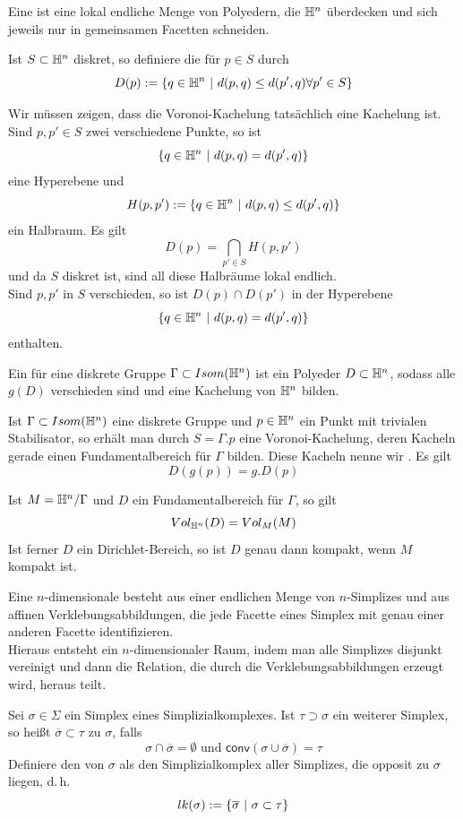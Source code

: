 \documentclass{book}
\begin{document}
\Def{}
Eine  ist eine lokal endliche Menge von Polyedern, die $\mathbb{H}^n$ überdecken und sich jeweils nur in gemeinsamen Facetten schneiden.

\Prop{}
Ist $S \subset \mathbb{H}^n$ diskret, so definiere die  für $p \in S$ durch
\[ D(p) := \set{q \in \H^n}{d(p,q) \leq d(p',q) \forall p' \in S } \]
\begin{Beweis}{}
	Wir müssen zeigen, dass die Voronoi-Kachelung tatsächlich eine Kachelung ist. Sind $p,p'\in S$ zwei verschiedene Punkte, so ist
	\[ \set{q \in \H^n}{d(p,q) = d(p',q)} \]
	eine Hyperebene und
	\[ H(p,p') := \set{q \in \H^n}{d(p,q) \leq d(p',q)} \]
	ein Halbraum. Es gilt
	\[ D(p) = \bigcap_{p'\in S} H(p,p')  \]
	und da $S$ diskret ist, sind all diese Halbräume lokal endlich.\\
	Sind $p,p'$ in $S$ verschieden, so ist $D(p) \cap D(p')$ in der Hyperebene
	\[\set{q \in \H^n}{d(p,q) = d(p',q)} \]
	enthalten.
\end{Beweis}

\Def{}
Ein  für eine diskrete Gruppe $\Gamma \subset Isom(\mathbb{H}^n)$ ist ein Polyeder $D \subset \mathbb{H}^n$, sodass alle $g(D)$ verschieden sind und eine Kachelung von $\mathbb{H}^n$ bilden.

\Bem{}
Ist $\Gamma \subset Isom(\mathbb{H}^n)$ eine diskrete Gruppe und $p\in \mathbb{H}^n$ ein Punkt mit trivialen Stabilisator, so erhält man durch $S = \Gamma.p$ eine Voronoi-Kachelung, deren Kacheln gerade einen Fundamentalbereich für $\Gamma$ bilden. Diese Kacheln nenne wir . Es gilt
\[ D(g(p)) = g.D(p) \]

\Prop{}
Ist $M = \mathbb{H}^n / \Gamma$ und $D$ ein Fundamentalbereich für $\Gamma$, so gilt
\[ Vol_{\mathbb{H}^n}(D) = Vol_M(M) \]
Ist ferner $D$ ein Dirichlet-Bereich, so ist $D$ genau dann kompakt, wenn $M$ kompakt ist.

\Def{}
Eine $n$-dimensionale  besteht aus einer endlichen Menge von $n$-Simplizes und aus affinen Verklebungsabbildungen, die jede Facette eines Simplex mit genau einer anderen Facette identifizieren.\\
Hieraus entsteht ein $n$-dimensionaler Raum, indem man alle Simplizes disjunkt vereinigt und dann die Relation, die durch die Verklebungsabbildungen erzeugt wird, heraus teilt.

\Def{}
Sei $\sigma \in \Sigma$ ein Simplex eines Simplizialkomplexes. Ist $\tau \supset \sigma$ ein weiterer Simplex, so heißt $\overline{\sigma} \subset \tau$  zu $\sigma$, falls
\[ \sigma \cap \overline{\sigma} = \emptyset \text{ und } \textsf{conv}(\sigma \cup \overline{\sigma}) = \tau \]
Definiere den  von $\sigma$ als den Simplizialkomplex aller Simplizes, die opposit zu $\sigma$ liegen, d.\,h.
\[ lk(\sigma) := \set{\overline{\sigma}}{\sigma \subset \tau}  \]
\end{document}
